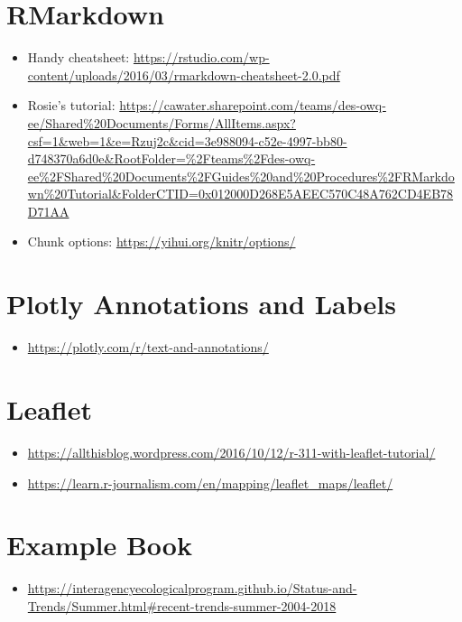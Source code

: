 \documentclass[
]{book}
\providecommand{\tightlist}{%
  \setlength{\itemsep}{0pt}\setlength{\parskip}{0pt}}
\begin{document}
\hypertarget{rmarkdown}{%
\section{RMarkdown}\label{rmarkdown}}

\begin{itemize}
\tightlist
\item
  Handy cheatsheet: \url{https://rstudio.com/wp-content/uploads/2016/03/rmarkdown-cheatsheet-2.0.pdf}
\item
  Rosie's tutorial: \url{https://cawater.sharepoint.com/teams/des-owq-ee/Shared\%20Documents/Forms/AllItems.aspx?csf=1\&web=1\&e=Rzuj2c\&cid=3e988094-c52e-4997-bb80-d748370a6d0e\&RootFolder=\%2Fteams\%2Fdes-owq-ee\%2FShared\%20Documents\%2FGuides\%20and\%20Procedures\%2FRMarkdown\%20Tutorial\&FolderCTID=0x012000D268E5AEEC570C48A762CD4EB78D71AA}
\item
  Chunk options: \url{https://yihui.org/knitr/options/}
\end{itemize}

\hypertarget{plotly-annotations-and-labels}{%
\section{Plotly Annotations and Labels}\label{plotly-annotations-and-labels}}

\begin{itemize}
\tightlist
\item
  \url{https://plotly.com/r/text-and-annotations/}
\end{itemize}

\hypertarget{leaflet}{%
\section{Leaflet}\label{leaflet}}

\begin{itemize}
\tightlist
\item
  \url{https://allthisblog.wordpress.com/2016/10/12/r-311-with-leaflet-tutorial/}
\item
  \url{https://learn.r-journalism.com/en/mapping/leaflet_maps/leaflet/}
\end{itemize}

\hypertarget{example-book}{%
\section{Example Book}\label{example-book}}

\begin{itemize}
\tightlist
\item
  \url{https://interagencyecologicalprogram.github.io/Status-and-Trends/Summer.html\#recent-trends-summer-2004-2018}
\end{itemize}

  
\end{document}
